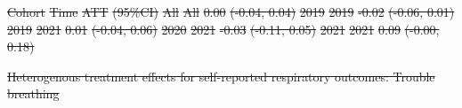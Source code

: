 \documentclass[
  letterpaper,
  DIV=11,
  numbers=noendperiod]{scrartcl}
\makeatletter
\renewenvironment{table}%
   {\renewcommand\familydefault\sfdefault
    \@float{table}}
   {\end@float}
\providecommand{\DIFdel}[1]{{\protect\color{red}\sout{#1}}}                      %
\providecommand{\DIFdelFL}[1]{\DIFdel{#1}} %
\makeatother
\begin{document}
\DIFdelFL{Cohort }%
\DIFdelFL{Time }%
\DIFdelFL{ATT }%
\DIFdelFL{(95\%CI)}%
\DIFdelFL{All }%
\DIFdelFL{All }%
\DIFdelFL{0.00 }%
\DIFdelFL{(-0.04, 0.04)}%
\DIFdelFL{2019 }%
\DIFdelFL{2019 }%
\DIFdelFL{-0.02 }%
\DIFdelFL{(-0.06, 0.01)}%
\DIFdelFL{2019 }%
\DIFdelFL{2021 }%
\DIFdelFL{0.01 }%
\DIFdelFL{(-0.04, 0.06)}%
\DIFdelFL{2020 }%
\DIFdelFL{2021 }%
\DIFdelFL{-0.03 }%
\DIFdelFL{(-0.11, 0.05)}%
\DIFdelFL{2021 }%
\DIFdelFL{2021 }%
\DIFdelFL{0.09 }%
\DIFdelFL{(-0.00, 0.18)}%

{%
\DIFdelFL{Heterogenous treatment effects for self-reported respiratory outcomes:
Trouble breathing }}%
\end{document}

